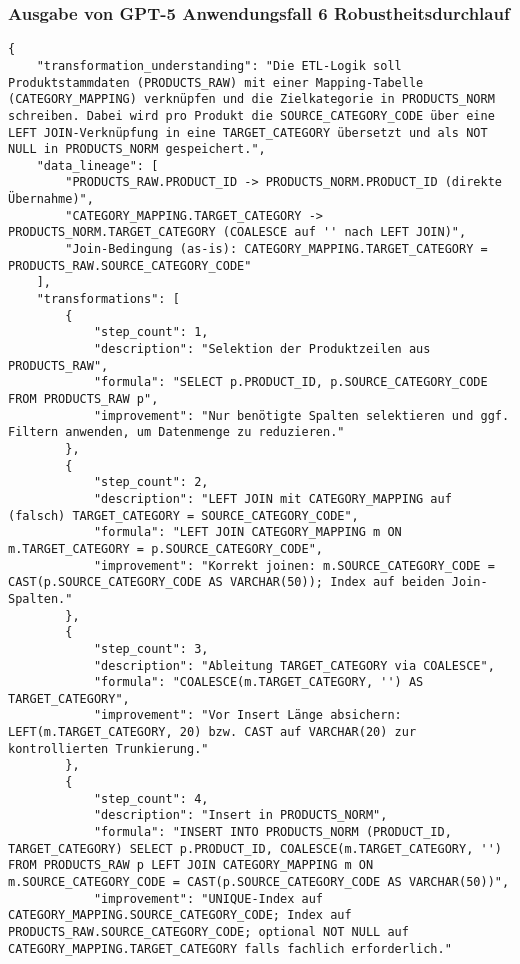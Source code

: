 \subsubsection{Ausgabe von GPT-5 Anwendungsfall 6 Robustheitsdurchlauf}\label{anhang:subsubsec:gpt_case6_prompt3}
\begin{lstlisting}[caption={Ausgabe: GPT-5 Anwendungsfall 6 Robustheitsdurchlauf},label={gpt_case6_prompt3}]
{
    "transformation_understanding": "Die ETL-Logik soll Produktstammdaten (PRODUCTS_RAW) mit einer Mapping-Tabelle (CATEGORY_MAPPING) verknüpfen und die Zielkategorie in PRODUCTS_NORM schreiben. Dabei wird pro Produkt die SOURCE_CATEGORY_CODE über eine LEFT JOIN-Verknüpfung in eine TARGET_CATEGORY übersetzt und als NOT NULL in PRODUCTS_NORM gespeichert.",
    "data_lineage": [
        "PRODUCTS_RAW.PRODUCT_ID -> PRODUCTS_NORM.PRODUCT_ID (direkte Übernahme)",
        "CATEGORY_MAPPING.TARGET_CATEGORY -> PRODUCTS_NORM.TARGET_CATEGORY (COALESCE auf '' nach LEFT JOIN)",
        "Join-Bedingung (as-is): CATEGORY_MAPPING.TARGET_CATEGORY = PRODUCTS_RAW.SOURCE_CATEGORY_CODE"
    ],
    "transformations": [
        {
            "step_count": 1,
            "description": "Selektion der Produktzeilen aus PRODUCTS_RAW",
            "formula": "SELECT p.PRODUCT_ID, p.SOURCE_CATEGORY_CODE FROM PRODUCTS_RAW p",
            "improvement": "Nur benötigte Spalten selektieren und ggf. Filtern anwenden, um Datenmenge zu reduzieren."
        },
        {
            "step_count": 2,
            "description": "LEFT JOIN mit CATEGORY_MAPPING auf (falsch) TARGET_CATEGORY = SOURCE_CATEGORY_CODE",
            "formula": "LEFT JOIN CATEGORY_MAPPING m ON m.TARGET_CATEGORY = p.SOURCE_CATEGORY_CODE",
            "improvement": "Korrekt joinen: m.SOURCE_CATEGORY_CODE = CAST(p.SOURCE_CATEGORY_CODE AS VARCHAR(50)); Index auf beiden Join-Spalten."
        },
        {
            "step_count": 3,
            "description": "Ableitung TARGET_CATEGORY via COALESCE",
            "formula": "COALESCE(m.TARGET_CATEGORY, '') AS TARGET_CATEGORY",
            "improvement": "Vor Insert Länge absichern: LEFT(m.TARGET_CATEGORY, 20) bzw. CAST auf VARCHAR(20) zur kontrollierten Trunkierung."
        },
        {
            "step_count": 4,
            "description": "Insert in PRODUCTS_NORM",
            "formula": "INSERT INTO PRODUCTS_NORM (PRODUCT_ID, TARGET_CATEGORY) SELECT p.PRODUCT_ID, COALESCE(m.TARGET_CATEGORY, '') FROM PRODUCTS_RAW p LEFT JOIN CATEGORY_MAPPING m ON m.SOURCE_CATEGORY_CODE = CAST(p.SOURCE_CATEGORY_CODE AS VARCHAR(50))",
            "improvement": "UNIQUE-Index auf CATEGORY_MAPPING.SOURCE_CATEGORY_CODE; Index auf PRODUCTS_RAW.SOURCE_CATEGORY_CODE; optional NOT NULL auf CATEGORY_MAPPING.TARGET_CATEGORY falls fachlich erforderlich."

\end{lstlisting}
